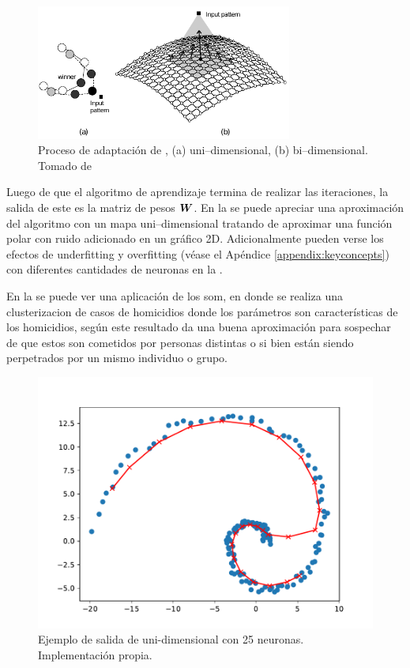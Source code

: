 \begin{figure}[H]
  \centering
  \includegraphics[width=0.75\textwidth]{Figures/som-adaptive-proc.pdf}
  \decoRule
  \caption[Proceso de adaptación de ]{Proceso de adaptación de , (a) uni--dimensional, (b) bi--dimensional. Tomado de \cite{de2006fundamentals}}
  \label{fig:som-adap-proc}
\end{figure}

Luego de que el algoritmo de aprendizaje termina de realizar las iteraciones, la salida de este es la matriz de pesos ${\bm{W}}$. En la  se puede apreciar una aproximación del algoritmo con un mapa uni--dimensional tratando de aproximar una función polar con ruido adicionado en un gráfico 2D. Adicionalmente pueden verse los efectos de \gls{underfitting} y \gls{overfitting} (véase el Apéndice \ref{appendix:keyconcepts}) con diferentes cantidades de neuronas en la .

En la  se puede ver una aplicación de los \gls{som}, en donde se realiza una clusterizacion de casos de homicidios donde los parámetros son características de los homicidios, según \cite{mena2003investigative} este resultado da una buena aproximación para sospechar de que estos son cometidos por personas distintas o si bien están siendo perpetrados por un mismo individuo o grupo.

\begin{figure}[H]
\centering
\includegraphics[width=\textwidth]{Figures/som-implementation-example25.pdf}
\decoRule
\caption[Ejemplo de salida de  uni-dimensional]{Ejemplo de salida de  uni-dimensional con 25 neuronas. Implementación propia.}
\label{fig:som-impl-example}
\end{figure}


